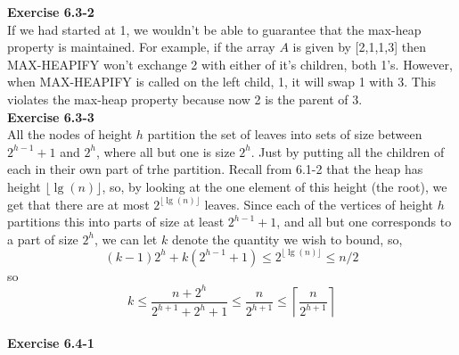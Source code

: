 \documentclass{article}
\begin{document}
\noindent\textbf{Exercise 6.3-2}\\

If we had started at 1, we wouldn't be able to guarantee that the max-heap property is maintained.  For example, if the array $A$ is given by [2,1,1,3] then MAX-HEAPIFY won't exchange 2 with either of it's children, both 1's.  However, when MAX-HEAPIFY is called on the left child, 1, it will swap 1 with 3.  This violates the max-heap property because now 2 is the parent of 3. \\

\noindent\textbf{Exercise 6.3-3}\\

All the nodes of height $h$ partition the set of leaves into sets of size between $2^{h-1}+1$ and $2^h$, where all but one is size $2^h$. Just by putting all the children of each in their own part of trhe partition. Recall from 6.1-2 that the heap has height $\lfloor \lg(n)\rfloor$, so, by looking at the one element of this height (the root), we get that there are at most $ 2^{\lfloor \lg(n)\rfloor}$ leaves. Since each of the vertices of height $h$ partitions this into parts of size at least $2^{h-1}+1$, and all but one corresponds to a part of size $2^h$, we can let $k$ denote the quantity we wish to bound, so,
\[
(k-1)2^h + k(2^{h-1}+1) \le 2^{\lfloor \lg(n) \rfloor} \le n/2
\]
so
\[
k \le  \frac{n+2^h}{2^{h+1} + 2^{h}+1 }\le \frac{n}{2^{h+1}} \le \left\lceil \frac{n}{2^{h+1}}\right\rceil
\]\\
 

\noindent\textbf{Exercise 6.4-1}\\
\end{document}
